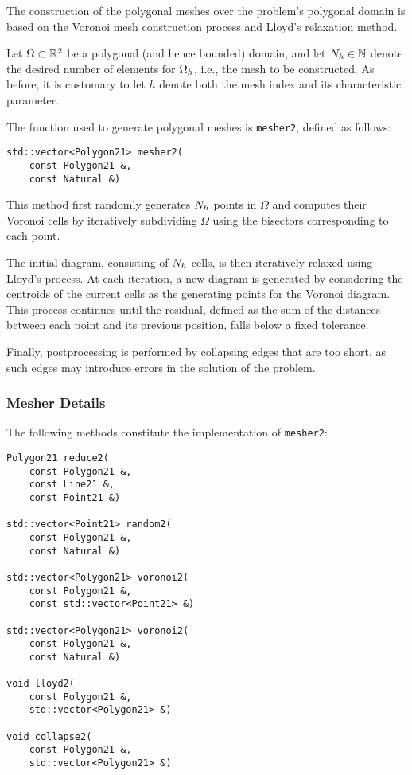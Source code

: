 The construction of the polygonal meshes over the problem's polygonal domain is based on the Voronoi mesh construction process and Lloyd's relaxation method.

Let $\Omega \subset \mathbb{R}^{2}$ be a polygonal (and hence bounded) domain, and let $N_h \in \mathbb{N}$ denote the desired number of elements for $\Omega_{h}$, i.e., the mesh to be constructed. As before, it is customary to let $h$ denote both the mesh index and its characteristic parameter.

The function used to generate polygonal meshes is \lstinline{mesher2}, defined as follows:

\begin{lstlisting}[style=cpp]
std::vector<Polygon21> mesher2(
    const Polygon21 &, 
    const Natural &)
\end{lstlisting}

This method first randomly generates $N_h$ points in $\Omega$ and computes their Voronoi cells by iteratively subdividing $\Omega$ using the bisectors corresponding to each point.

The initial diagram, consisting of $N_h$ cells, is then iteratively relaxed using Lloyd's process. At each iteration, a new diagram is generated by considering the centroids of the current cells as the generating points for the Voronoi diagram. This process continues until the residual, defined as the sum of the distances between each point and its previous position, falls below a fixed tolerance.

Finally, postprocessing is performed by collapsing edges that are too short, as such edges may introduce errors in the solution of the problem.

\newpage
\subsubsection{Mesher Details}

The following methods constitute the implementation of \lstinline{mesher2}:

\begin{lstlisting}[style=cpp]
Polygon21 reduce2(
    const Polygon21 &, 
    const Line21 &, 
    const Point21 &)

std::vector<Point21> random2(
    const Polygon21 &, 
    const Natural &)

std::vector<Polygon21> voronoi2(
    const Polygon21 &, 
    const std::vector<Point21> &)

std::vector<Polygon21> voronoi2(
    const Polygon21 &, 
    const Natural &)

void lloyd2(
    const Polygon21 &, 
    std::vector<Polygon21> &)

void collapse2(
    const Polygon21 &, 
    std::vector<Polygon21> &)
\end{lstlisting}

